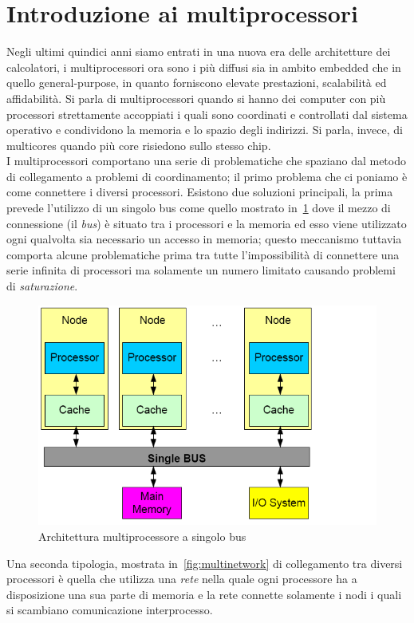 \section{Introduzione ai multiprocessori}\label{capitolo8}
Negli ultimi quindici anni siamo entrati in una nuova era delle architetture dei calcolatori, i multiprocessori ora sono i più diffusi sia in ambito embedded che in quello general-purpose, in quanto forniscono elevate prestazioni, scalabilità ed affidabilità. Si parla di multiprocessori quando si hanno dei computer con più processori strettamente accoppiati i quali sono coordinati e controllati dal sistema operativo e condividono la memoria e lo spazio degli indirizzi. Si parla, invece, di multicores quando più core risiedono sullo stesso chip.\\
I multiprocessori comportano una serie di problematiche che spaziano dal metodo di collegamento a problemi di coordinamento; il primo problema che ci poniamo è come connettere i diversi processori. Esistono due soluzioni principali, la prima prevede l'utilizzo di un singolo bus come quello mostrato in \figurename\,\ref{fig:multisinglebus} dove il mezzo di connessione (il \emph{bus}) è situato tra i processori e la memoria ed esso viene utilizzato ogni qualvolta sia necessario un accesso in memoria; questo meccanismo tuttavia comporta alcune problematiche prima tra tutte l'impossibilità di connettere una serie infinita di processori ma solamente un numero limitato causando problemi di \emph{saturazione}.
\begin{figure}[htb]
\centering
\includegraphics[scale=0.5]{img/multisinglebus.png}
\caption{Architettura multiprocessore a singolo bus}\label{fig:multisinglebus}
\end{figure}
Una seconda tipologia, mostrata in \figurename\,\ref{fig:multinetwork} di collegamento tra diversi processori è quella che utilizza una \emph{rete} nella quale ogni processore ha a disposizione una sua parte di memoria e la rete connette solamente i nodi i quali si scambiano comunicazione interprocesso. 
